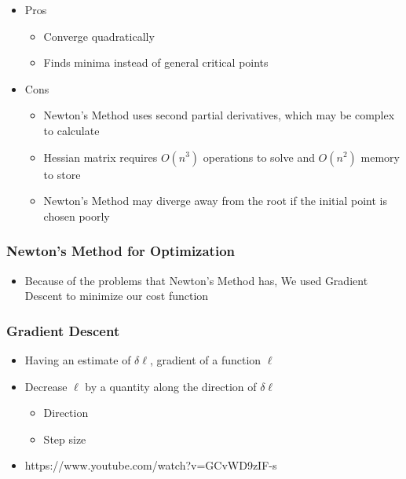 \begin{frame}
\begin{itemize}
    \item Pros 
    \begin{itemize}
    \item Converge quadratically
    \item Finds minima instead of general critical points
       \end{itemize}
        
            \item Cons 
               \begin{itemize}
               \item Newton's Method uses second partial derivatives, which may be complex to calculate
               \item Hessian matrix requires $O(n^3)$ operations to solve and $O(n^2)$ memory to store
               \item Newton's Method may diverge away from the root if the initial point is chosen poorly 
       \end{itemize}
          \end{itemize}
  \end{frame}





\begin{frame}
\frametitle{Newton's Method for Optimization}
\begin{itemize}
    \item  Because of the problems that Newton's Method has, We used Gradient Descent to minimize our cost function 
    \\
\begin{center}

  \end{center}
 
   \end{itemize}   
  \end{frame}
 



\begin{frame}
\frametitle{Gradient Descent}
\begin{itemize}

\item Having an estimate of $\delta \ell$, gradient of a function $\ell$ 
\item Decrease $\ell$ by a quantity along the direction of $\delta \ell$
  \begin{itemize}
  \item Direction
  \item Step size
  \end{itemize}
\item https://www.youtube.com/watch?v=GCvWD9zIF-s
\end{itemize}

\end{frame}



